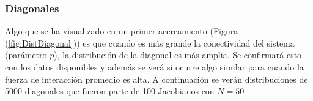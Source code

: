 \subsubsection*{Diagonales}

Algo que se ha visualizado en un primer acercamiento (Figura (\ref{fig:DistDiagonal})) es que cuando es más grande la conectividad del sistema (parámetro $p$), la distribución de la diagonal es más amplia. Se confirmará esto con los datos disponibles y además se verá si ocurre algo similar para cuando la fuerza de interacción promedio es alta. A continuación se verán distribuciones de 5000 diagonales que fueron parte de 100 Jacobianos con $N=50$



